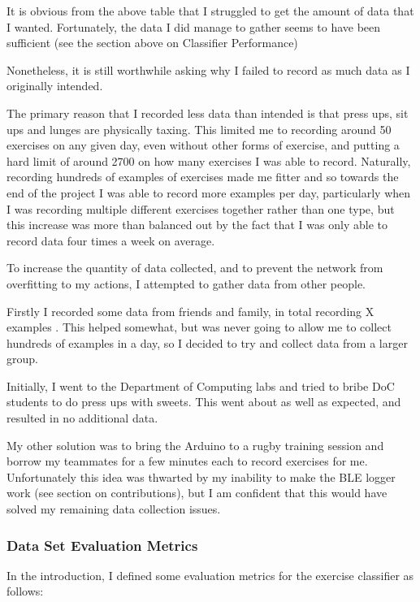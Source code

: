 \documentclass[a4paper]{article}
\begin{document}
It is obvious from the above table that I struggled to get the amount of data that I wanted. Fortunately, the data I did manage to gather seems to have been sufficient (see the section above on Classifier Performance)

Nonetheless, it is still worthwhile asking why I failed to record as much data as I originally intended. 

The primary reason that I recorded less data than intended is that press ups, sit ups and lunges are physically taxing.\cite{evref2} This limited me to recording around 50 exercises on any given day, even without other forms of exercise, and putting a hard limit of around 2700 on how many exercises I was able to record.\cite{evref3} 
Naturally, recording hundreds of examples of exercises made me fitter and so towards the end of the project I was able to record more examples per day, particularly when I was recording multiple different exercises together rather than one type, but this increase was more than balanced out by the fact that I was only able to record data four times a week on average.

To increase the quantity of data collected, and to prevent the network from overfitting to my actions, I attempted to gather data from other people. 

Firstly I recorded some data from friends and family, in total recording X examples . This helped somewhat, but was never going to allow me to collect hundreds of examples in a day, so I decided to try and collect data from a larger group.

Initially, I went to the Department of Computing labs and tried to bribe DoC students to do press ups with sweets. This went about as well as expected, and resulted in no additional data. 

My other solution was to bring the Arduino to a rugby training session and borrow my teammates for a few minutes each to record exercises for me. Unfortunately this idea was thwarted by my inability to make the BLE logger work (see section on contributions), but I am confident that this would have solved my remaining data collection issues.

\subsubsection{Data Set Evaluation Metrics}

In the introduction, I defined some evaluation metrics for the exercise classifier as follows:
\end{document}
